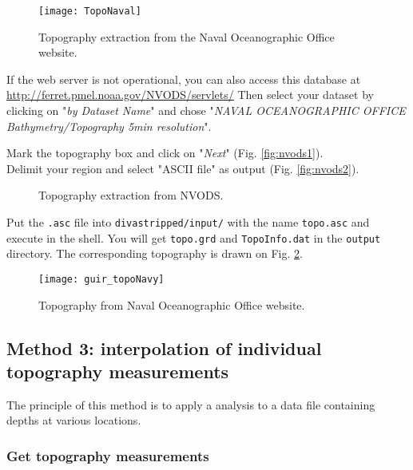\begin{figure}[htpb]
\centering
\texttt{[image: TopoNaval]}
\caption{Topography extraction from the Naval Oceanographic Office website.\label{fig:topoextract}}
\end{figure}

If the web server is not operational, you can also access this database at \url{http://ferret.pmel.noaa.gov/NVODS/servlets/}
Then select your dataset by clicking on "\textsl{by Dataset Name}" and chose 
"\textsl{NAVAL OCEANOGRAPHIC OFFICE Bathymetry/Topography 5min resolution}".

Mark the topography box and click on "\textsl{Next}" (Fig. \ref{fig:nvods1}).\\
Delimit your region and select "ASCII file" as output (Fig. \ref{fig:nvods2}). 


\begin{figure}[htpb]
\centering
{}

\caption{Topography extraction from NVODS.}
\end{figure}


Put the \texttt{.asc} file into \texttt{divastripped/input/} with the name \texttt{topo.asc} and execute  in the shell. You will get \texttt{topo.grd} and \texttt{TopoInfo.dat} in the \texttt{output} directory. The corresponding topography is drawn on Fig. \ref{fig:topoNaval}.


\begin{figure}[htpb]
\centering
\texttt{[image: guir\_topoNavy]}
\caption{Topography from Naval Oceanographic Office website.\label{fig:topoNaval}}
\end{figure}


\subsection{Method 3: interpolation of individual topography measurements\label{sec:topotopex}}

The principle of this method is to apply a \diva\divaspace analysis to a data file containing depths at various locations.

\subsubsection{Get topography measurements}


